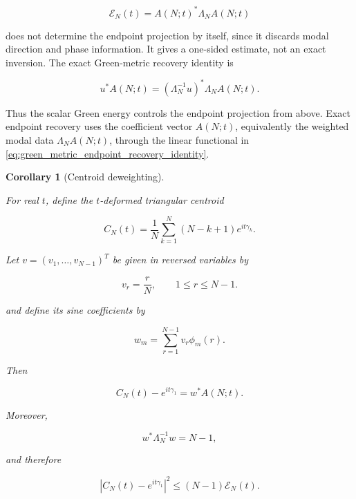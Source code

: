 \documentclass[11pt]{amsart}
\numberwithin{equation}{section}
\theoremstyle{plain}
\newtheorem{corollary}[theorem]{Corollary}
\theoremstyle{definition}
\theoremstyle{remark}
\begin{document}
\begin{equation}
\mathcal E_N(t)=A(N;t)^*\Lambda_NA(N;t)
\end{equation}

does not determine the endpoint projection by itself, since it discards
modal direction and phase information. It gives a one-sided estimate, not
an exact inversion. The exact Green-metric recovery identity is

\begin{equation}
u^*A(N;t)
=
(\Lambda_N^{-1}u)^*\Lambda_NA(N;t).
\label{eq:green_metric_endpoint_recovery_identity}
\end{equation}

Thus the scalar Green energy controls the endpoint projection from above.
Exact endpoint recovery uses the coefficient vector \(A(N;t)\),
equivalently the weighted modal data \(\Lambda_NA(N;t)\), through the
linear functional in \eqref{eq:green_metric_endpoint_recovery_identity}.

\begin{corollary}[Centroid deweighting]
\label{cor:centroid_green_deweighting}

For real \(t\), define the \(t\)-deformed triangular centroid

\begin{equation}
C_N(t)
=
\frac1N
\sum_{k=1}^{N}
(N-k+1)e^{it\gamma_k}.
\label{eq:t_deformed_centroid_definition}
\end{equation}

Let \(v=(v_1,\ldots,v_{N-1})^T\) be given in reversed variables by

\begin{equation}
v_r=\frac rN,
\qquad
1\le r\le N-1.
\label{eq:centroid_deweighting_vector_v}
\end{equation}

and define its sine coefficients by

\begin{equation}
w_m
=
\sum_{r=1}^{N-1}v_r\phi_m(r).
\label{eq:centroid_deweighting_coefficients_wm}
\end{equation}

Then

\begin{equation}
C_N(t)-e^{it\gamma_1}
=
w^*A(N;t).
\label{eq:centroid_exact_modal_recovery}
\end{equation}

Moreover,

\begin{equation}
w^*\Lambda_N^{-1}w
=
N-1,
\label{eq:centroid_green_dual_norm}
\end{equation}

and therefore

\begin{equation}
|C_N(t)-e^{it\gamma_1}|^2
\le
(N-1)\mathcal E_N(t).
\label{eq:centroid_green_deweighting_bound}
\end{equation}

\end{corollary}
\end{document}
